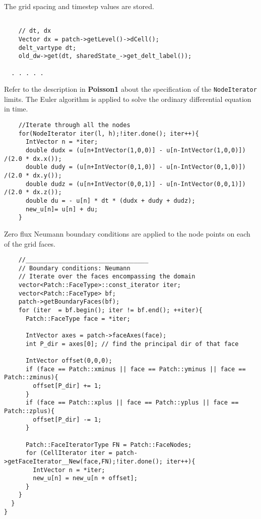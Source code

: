 \documentclass[12pt]{report}
\begin{document}
The grid spacing and timestep values are stored.

\begin{verbatim}

    // dt, dx
    Vector dx = patch->getLevel()->dCell();
    delt_vartype dt;
    old_dw->get(dt, sharedState_->get_delt_label());
    
  . . . . .  
\end{verbatim}

Refer to the description in \textbf{Poisson1} about the specification
of the \texttt{NodeIterator} limits.  The Euler algorithm is applied to solve
the ordinary differential equation in time.

\begin{verbatim}                   
    //Iterate through all the nodes
    for(NodeIterator iter(l, h);!iter.done(); iter++){    
      IntVector n = *iter;
      double dudx = (u[n+IntVector(1,0,0)] - u[n-IntVector(1,0,0)]) /(2.0 * dx.x());
      double dudy = (u[n+IntVector(0,1,0)] - u[n-IntVector(0,1,0)]) /(2.0 * dx.y());
      double dudz = (u[n+IntVector(0,0,1)] - u[n-IntVector(0,0,1)]) /(2.0 * dx.z());
      double du = - u[n] * dt * (dudx + dudy + dudz);
      new_u[n]= u[n] + du;
    }

\end{verbatim}

Zero flux Neumann boundary conditions are applied to the node points
on each of the grid faces.


\begin{verbatim}
    //__________________________________
    // Boundary conditions: Neumann
    // Iterate over the faces encompassing the domain
    vector<Patch::FaceType>::const_iterator iter;
    vector<Patch::FaceType> bf;
    patch->getBoundaryFaces(bf);
    for (iter  = bf.begin(); iter != bf.end(); ++iter){
      Patch::FaceType face = *iter;

      IntVector axes = patch->faceAxes(face);
      int P_dir = axes[0]; // find the principal dir of that face

      IntVector offset(0,0,0);
      if (face == Patch::xminus || face == Patch::yminus || face == Patch::zminus){
        offset[P_dir] += 1; 
      }
      if (face == Patch::xplus || face == Patch::yplus || face == Patch::zplus){
        offset[P_dir] -= 1;
      }

      Patch::FaceIteratorType FN = Patch::FaceNodes;
      for (CellIterator iter = patch->getFaceIterator__New(face,FN);!iter.done(); iter++){
        IntVector n = *iter;
        new_u[n] = new_u[n + offset];
      }
    }
  }
}

\end{verbatim}
\end{document}
